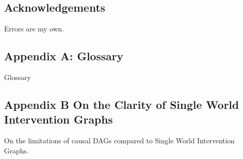 \documentclass[
  single column]{article}
\begin{document}
\subsection{Acknowledgements}\label{acknowledgements}

Errors are my own.

\subsection{Appendix A: Glossary}\label{appendix-a-glossary}

\begin{table}

\caption{\label{tbl-gloassary}Glossary}

\centering{

\glossaryTerms

}

\end{table}%

\subsection{Appendix B On the Clarity of Single World Intervention
Graphs}\label{appendix-b-on-the-clarity-of-single-world-intervention-graphs}

\newpage{}

\begin{table}

\caption{\label{tbl-pearltable}On the limitations of causal DAGs
compared to Single World Intervention Graphs.}

\centering{

\pearltable

}

\end{table}%
\end{document}
